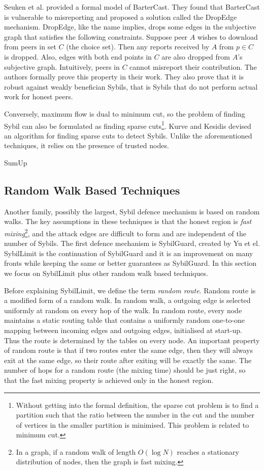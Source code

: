 Seuken et al. provided a formal model of BarterCast. They found that BarterCast
is vulnerable to misreporting and proposed a solution called the DropEdge
mechanism\cite{seuken2011sybil, seuken2014sybil}. DropEdge, like the name
implies, drops some edges in the subjective graph that satisfies the following
constraints. Suppose peer $A$ wishes to download from peers in set $C$ (the
choice set). Then any reports received by $A$ from $p \in C$ is dropped. Also,
edges with both end points in $C$ are also dropped from $A$'s subjective graph.
Intuitively, peers in $C$ cannot misreport their contribution. The authors
formally prove this property in their work. They also prove that it is robust
against weakly benefician Sybils, that is Sybils that do not perform actual work
for honest peers.

Conversely, maximum flow is dual to minimum cut, so the problem of finding Sybil
can also be formulated as finding sparse cuts\footnote{Without getting into the
  formal definition, the sparse cut problem is to find a partition such that the
  ratio between the number in the cut and the number of vertices in the smaller
  partition is minimised. This problem is related to minimum cut.}. Kurve and
Kesidis devised an algorithm for finding sparse cuts to detect
Sybils\cite{kurve2011sybil}. Unlike the aforementioned techniques, it relies on
the presence of trusted nodes.

SumUp\cite{tran2009sybil}

\subsection{Random Walk Based Techniques}
Another family, possibly the largest, Sybil defence mechanism is based on random
walks. The key assumptions in these techniques is that the honest region is
\emph{fast mixing}\footnote{In a graph, if a random walk of length $O(\log{N})$
  reaches a stationary distribution of nodes, then the graph is fast mixing.},
and the attack edges are difficult to form and are independent of the number of
Sybils. The first defence mechanism is SybilGuard\cite{yu2006sybilguard},
created by Yu et el. SybilLimit\cite{yu2008sybillimit} is the continuation of
SybilGuard and it is an improvement on many fronts while keeping the same or
better guarantees as SybilGuard. In this section we focus on SybilLimit plus
other random walk based techniques.

Before explaining SybilLimit, we define the term \emph{random route}. Random
route is a modified form of a random walk. In random walk, a outgoing edge is
selected uniformly at random on every hop of the walk. In random route, every
node maintains a static routing table that contains a uniformly random
one-to-one mapping between incoming edges and outgoing edges, initialised at
start-up. Thus the route is determined by the tables on every node. An important
property of random route is that if two routes enter the same edge, then they
will always exit at the same edge, so their route after exiting will be exactly
the same. The number of hops for a random route (the mixing time) should be just
right, so that the fast mixing property is achieved only in the honest region.


